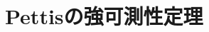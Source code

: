 \section{Pettisの強可測性定理}
	\begin{screen}
		\begin{lem}[距離空間値の可測関数列の極限は可測]
			
		\end{lem}
	\end{screen}
	